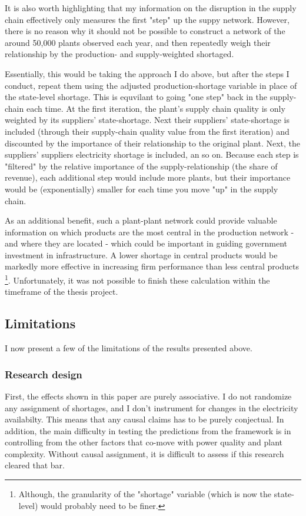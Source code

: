\documentclass[11pt]{article}
\begin{document}
 


It is also worth highlighting that my information on the disruption in the supply chain effectively only measures the first "step" up the suppy network. However, there is no reason why it should not be possible to construct a network of the around 50,000 plants observed each year, and then repeatedly weigh their relationship by the production- and supply-weighted shortaged.

Essentially, this would be taking the approach I do above, but after the steps I conduct, repeat them using the adjusted production-shortage variable in place of the state-level shortage. This is equvilant to going "one step" back in the supply-chain each time. At the first iteration, the plant's supply chain quality is only weighted by its suppliers' state-shortage. Next their suppliers' state-shortage is included (through their supply-chain quality value from the first iteration) and discounted by the importance of their relationship to the original plant. Next, the suppliers' suppliers electricity shortage is included, an so on. Because each step is "filtered" by the relative importance of the supply-relationship (the share of revenue), each additional step would include more plants, but their importance would be (exponentially) smaller for each time you move "up" in the supply chain. 

As an additional benefit, such a plant-plant network could provide valuable information on which products are the most central in the production network - and where they are located - which could be important in guiding government investment in infrastructure. A lower shortage in central products would be markedly more effective in increasing firm performance than less central products \footnote{Although, the granularity of the "shortage" variable (which is now the state-level) would probably need to be finer.}. Unfortunately, it was not possible to finish these calculation within the timeframe of the thesis project.

\subsection{Limitations}
\label{sec:org979560b}
I now present a few of the limitations of the results presented above. 

\subsubsection{Research design}
First, the effects shown in this paper are purely associative. I do not randomize any assignment of shortages, and I don't instrument for changes in the electricity availabilty. This means that any causal claims has to be purely conjectual. In addition, the main difficulty in testing the predictions from the framework is in controlling from the other factors that co-move with power quality and plant complexity. Without causal assignment, it is difficult to assess if this research cleared that bar.
\end{document}
